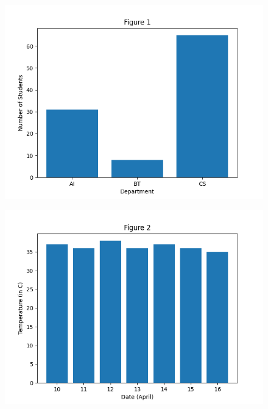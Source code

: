\documentclass[journal,12pt,twocolumn]{IEEEtran}
\begin{document}
	\begin{figure}[!ht]
		\centering
		\includegraphics[width=\columnwidth]{figs/fig-1.png}
		\label{fig1}
	\end{figure}
	
	\begin{figure}[!ht]
		\centering
		\includegraphics[width=\columnwidth]{figs/fig-2.png}
		\label{fig2}
	\end{figure}
	
\end{document}
